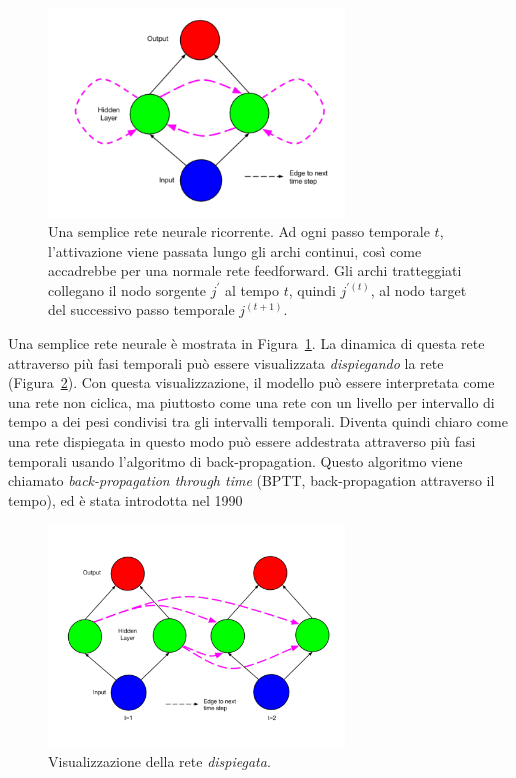 \begin{figure}[tp]
  \centering
  \begin{center}
    \includegraphics[width=0.7\textwidth]{./images/simpleRecurrentNeuralNetwork.png}
  \end{center}
  \caption{Una semplice rete neurale ricorrente.
  Ad ogni passo temporale $t$, l'attivazione viene passata lungo gli archi continui,
  cos\`i come accadrebbe per una normale rete feedforward.
  Gli archi tratteggiati collegano il nodo sorgente $j^{'}$ al tempo $t$, quindi
  $j^{'(t)}$, al nodo target del successivo passo temporale $j^{(t+1)}$.}
  \label{fig:simpleRecurrentNeuralNetwork}
\end{figure}

Una semplice rete neurale \`e mostrata in Figura~\ref{fig:simpleRecurrentNeuralNetwork}.
La dinamica di questa rete attraverso pi\`u fasi temporali pu\`o essere visualizzata
\emph{dispiegando} la rete (Figura~\ref{fig:unfoldedSimpleRecurrentNeuralNetwork}).
Con questa visualizzazione, il modello pu\`o essere interpretata come una rete
non ciclica, ma piuttosto come una rete con un livello per intervallo di tempo
a dei pesi condivisi tra gli intervalli temporali. Diventa quindi chiaro come
 una rete dispiegata in questo modo pu\`o essere addestrata attraverso pi\`u
 fasi temporali usando l'algoritmo di back-propagation. Questo algoritmo viene
chiamato \emph{back-propagation through time} (BPTT, back-propagation attraverso
il tempo), ed \`e stata introdotta nel 1990~\cite{Werbos:1990}

\begin{figure}[tp]
  \centering
  \begin{center}
    \includegraphics[width=0.7\textwidth]{./images/unfoldedSimpleRecurrentNeuralNetwork.png}
  \end{center}
  \caption{Visualizzazione della rete \emph{dispiegata}.}
  \label{fig:unfoldedSimpleRecurrentNeuralNetwork}
\end{figure}

